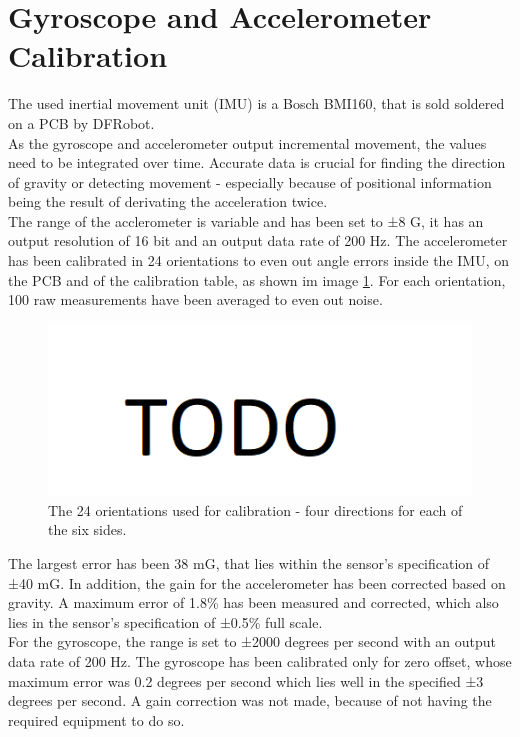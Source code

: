 \section{Gyroscope and Accelerometer Calibration}
\label{sec:GyroCal}
The used inertial movement unit (IMU) is a Bosch BMI160, that is sold soldered on a PCB by DFRobot.\\
As the gyroscope and accelerometer output incremental movement, the values need to be integrated over time. Accurate data is crucial for finding the direction of gravity or detecting movement - especially because of positional information being the result of derivating the acceleration twice.\\
The range of the acclerometer is variable and has been set to ±8 G, it has an output resolution of 16 bit and an output data rate of 200 Hz.
The accelerometer has been calibrated in 24 orientations to even out angle errors inside the IMU, on the PCB and of the calibration table, as shown im image \ref{im:IMU_cal}. For each orientation, 100 raw measurements have been averaged to even out noise. 
\begin{figure}[H]
    \centering
    \includegraphics[width=1.0\textwidth]{images/todo.png}
    \caption{The 24 orientations used for calibration - four directions for each of the six sides.}
    \label{im:IMU_cal}
\end{figure}
The largest error has been 38 mG, that lies within the sensor's specification of ±40 mG\cite{BMI160}. In addition, the gain for the accelerometer has been corrected based on gravity. A maximum error of 1.8\% has been measured and corrected, which also lies in the sensor's specification of ±0.5\% full scale\cite{BMI160}.\\
For the gyroscope, the range is set to ±2000 degrees per second with an output data rate of 200 Hz. The gyroscope has been calibrated only for zero offset, whose maximum error was 0.2 degrees per second which lies well in the specified ±3 degrees per second\cite{BMI160}. A gain correction was not made, because of not having the required equipment to do so.\\
